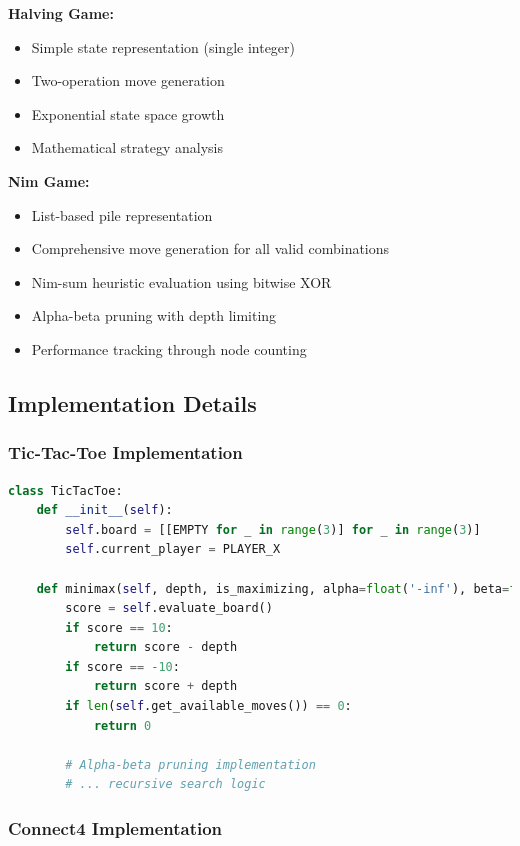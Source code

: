 \documentclass[12pt]{article}
\begin{document}
\textbf{Halving Game:}
\begin{itemize}
    \item Simple state representation (single integer)
    \item Two-operation move generation
    \item Exponential state space growth
    \item Mathematical strategy analysis
\end{itemize}

\textbf{Nim Game:}
\begin{itemize}
    \item List-based pile representation
    \item Comprehensive move generation for all valid combinations
    \item Nim-sum heuristic evaluation using bitwise XOR
    \item Alpha-beta pruning with depth limiting
    \item Performance tracking through node counting
\end{itemize}

\subsection{Implementation Details}

\subsubsection{Tic-Tac-Toe Implementation}

\begin{lstlisting}[language=Python, basicstyle=\small]
class TicTacToe:
    def __init__(self):
        self.board = [[EMPTY for _ in range(3)] for _ in range(3)]
        self.current_player = PLAYER_X
    
    def minimax(self, depth, is_maximizing, alpha=float('-inf'), beta=float('inf')):
        score = self.evaluate_board()
        if score == 10:
            return score - depth
        if score == -10:
            return score + depth
        if len(self.get_available_moves()) == 0:
            return 0
        
        # Alpha-beta pruning implementation
        # ... recursive search logic
\end{lstlisting}

\subsubsection{Connect4 Implementation}
\end{document}
